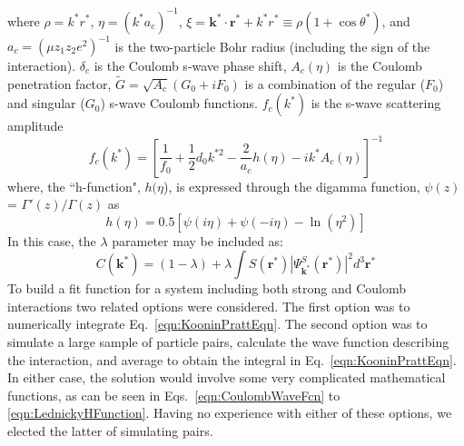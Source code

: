 \documentclass[ALICE,manyauthors]{cernphprep}
\begin{document}
where $\rho = k^{*}r^{*}$, $\eta = (k^{*}a_{c})^{-1}$, $\xi = \mathbf{k^{*}} \cdot \mathbf{r^{*}} + k^{*}r^{*} \equiv \rho(1+\cos\theta^{*})$, and $a_{c} = (\mu z_{1}z_{2}e^{2})^{-1}$ is the two-particle Bohr radius (including the sign of the interaction).  
$\delta_{c}$ is the Coulomb s-wave phase shift, $A_{c}(\eta)$ is the Coulomb penetration factor, $\tilde{G} = \sqrt{A_{c}}(G_{0} + iF_{0})$ is a combination of the regular ($F_{0}$) and singular ($G_{0}$) s-wave Coulomb functions.  
$f_{c}(k^{*})$ is the s-wave scattering amplitude
\begin{equation}
 f_{c}(k^{*}) = \left[\frac{1}{f_{0}} + \frac{1}{2}d_{0}k^{*2} - \frac{2}{a_{c}}h(\eta) - ik^{*}A_{c}(\eta)\right]^{-1}
\label{eqn:CoulombScattAmp}
\end{equation}
where, the ``h-function", $h(\eta$), is expressed through the digamma function, $\psi(z)$ = $\Gamma'(z)/\Gamma(z)$ as
\begin{equation}
 h(\eta) = 0.5[\psi(i\eta) + \psi(-i\eta) - \ln(\eta^{2})]
\label{eqn:LednickyHFunction}
\end{equation} 
In this case, the $\lambda$ parameter may be included as: 
\begin{equation}
 C(\mathbf{k^{*}}) = (1 - \lambda) + \lambda\int S(\mathbf{r^{*}})|\Psi^{S}_{\mathbf{k^{*}}}(\mathbf{r^{*}})|^{2}d^{3}\mathbf{r^{*}}
\label{eqn:GenCfEqnwLambda}
\end{equation}
To build a fit function for a system including both strong and Coulomb interactions two related options were considered. 
The first option was to numerically integrate Eq.\ \ref{eqn:KooninPrattEqn}.  
The second option was to simulate a large sample of particle pairs, calculate the wave function describing the interaction, and average to obtain the integral in Eq.\ \ref{eqn:KooninPrattEqn}. 
In either case, the solution would involve some very complicated mathematical functions, as can be seen in Eqs.\ \ref{eqn:CoulombWaveFcn} to \ref{eqn:LednickyHFunction}.
Having no experience with either of these options, we elected the latter of simulating pairs. 

\end{document}
